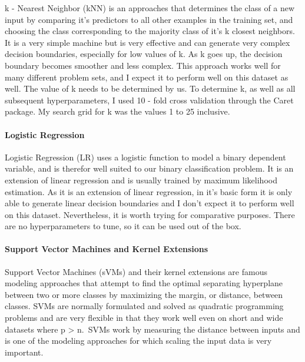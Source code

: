 \documentclass[
]{article}
\begin{document}
k - Nearest Neighbor (kNN) is an approaches that determines the class of
a new input by comparing it's predictors to all other examples in the
training set, and choosing the class corresponding to the majority class
of it's k closest neighbors. It is a very simple machine but is very
effective and can generate very complex decision boundaries, especially
for low values of k. As k goes up, the decision boundary becomes
smoother and less complex. This approach works well for many different
problem sets, and I expect it to perform well on this dataset as well.
The value of k needs to be determined by us. To determine k, as well as
all subsequent hyperparameters, I used 10 - fold cross validation
through the Caret package. My search grid for k was the values 1 to 25
inclusive.

\hypertarget{logistic-regression}{%
\paragraph{Logistic Regression}\label{logistic-regression}}

Logistic Regression (LR) uses a logistic function to model a binary
dependent variable, and is therefor well suited to our binary
classification problem. It is an extension of linear regression and is
usually trained by maximum likelihood estimation. As it is an extension
of linear regression, in it's basic form it is only able to generate
linear decision boundaries and I don't expect it to perform well on this
dataset. Nevertheless, it is worth trying for comparative purposes.
There are no hyperparameters to tune, so it can be used out of the box.

\hypertarget{support-vector-machines-and-kernel-extensions}{%
\paragraph{Support Vector Machines and Kernel
Extensions}\label{support-vector-machines-and-kernel-extensions}}

Support Vector Machines (sVMs) and their kernel extensions are famous
modeling approaches that attempt to find the optimal separating
hyperplane between two or more classes by maximizing the margin, or
distance, between classes. SVMs are normally formulated and solved as
quadratic programming problems and are very flexible in that they work
well even on short and wide datasets where p \textgreater{} n.~SVMs work
by measuring the distance between inputs and is one of the modeling
approaches for which scaling the input data is very important.
\end{document}
